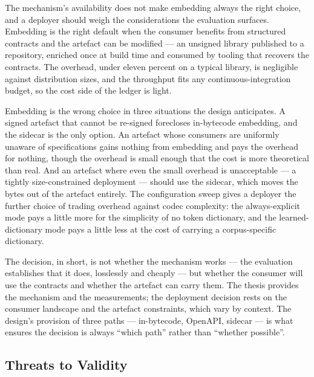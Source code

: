 The mechanism's availability does not make embedding always the right choice, and a
deployer should weigh the considerations the evaluation surfaces. Embedding is the
right default when the consumer benefits from structured contracts and the artefact
can be modified --- an unsigned library published to a repository, enriched once at
build time and consumed by tooling that recovers the contracts. The overhead, under
eleven percent on a typical library, is negligible against distribution sizes, and
the throughput fits any continuous-integration budget, so the cost side of the
ledger is light.

Embedding is the wrong choice in three situations the design anticipates. A signed
artefact that cannot be re-signed forecloses in-bytecode embedding, and the sidecar
is the only option. An artefact whose consumers are uniformly unaware of
specifications gains nothing from embedding and pays the overhead for nothing,
though the overhead is small enough that the cost is more theoretical than real. And
an artefact where even the small overhead is unacceptable --- a tightly
size-constrained deployment --- should use the sidecar, which moves the bytes out of
the artefact entirely. The configuration sweep gives a deployer the further choice of
trading overhead against codec complexity: the always-explicit mode pays a little
more for the simplicity of no token dictionary, and the learned-dictionary mode pays
a little less at the cost of carrying a corpus-specific dictionary.

The decision, in short, is not whether the mechanism works --- the evaluation
establishes that it does, losslessly and cheaply --- but whether the consumer will
use the contracts and whether the artefact can carry them. The thesis provides the
mechanism and the measurements; the deployment decision rests on the consumer
landscape and the artefact constraints, which vary by context. The design's
provision of three paths --- in-bytecode, OpenAPI, sidecar --- is what ensures the
decision is always ``which path'' rather than ``whether possible''.

\subsection{Threats to Validity}


